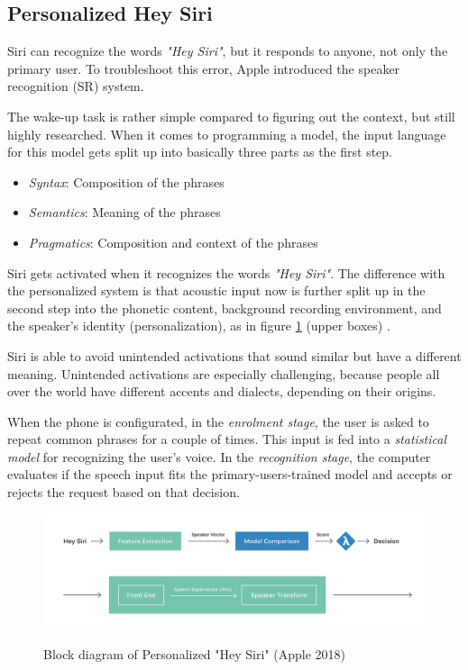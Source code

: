 \subsection{Personalized Hey Siri}
Siri can recognize the words \textit{"Hey Siri"}, but it responds to anyone, not only the primary user. To troubleshoot this error, Apple introduced the speaker recognition (SR) system.

The wake-up task is rather simple compared to figuring out the context, but still highly researched. When it comes to programming a model, the input language for this model gets split up into basically three parts as the first step\cite{siri2}.

\begin{itemize}
\item \textit{Syntax}: Composition of the phrases
\item \textit{Semantics}: Meaning of the phrases
\item \textit{Pragmatics}: Composition and context of the phrases
\end{itemize}

Siri gets activated when it recognizes the words \textit{"Hey Siri"}. The difference with the personalized system is that acoustic input now is further split up in the second step into the phonetic content, background recording environment, and the speaker's identity (personalization), as in figure \ref{siri1} (upper boxes) \cite{siri2}.

Siri is able to avoid unintended activations that sound similar but have a different meaning. Unintended activations are especially challenging, because people all over the world have different accents and dialects, depending on their origins. 

When the phone is configurated, in the \textit{enrolment stage}, the user is asked to repeat common phrases for a couple of times. This input is fed into a \textit{statistical model} for recognizing the user's voice. In the \textit{recognition stage}, the computer evaluates if the speech input fits the primary-users-trained model and accepts or rejects the request based on that decision.

	
\begin{figure}
  \begin{center}
  \includegraphics[width=4.5in]{photos/siri1}\\
  \caption{Block diagram of Personalized "Hey Siri" (Apple 2018)\cite{siri2}}\label{siri1}
  \end{center}
\end{figure}

